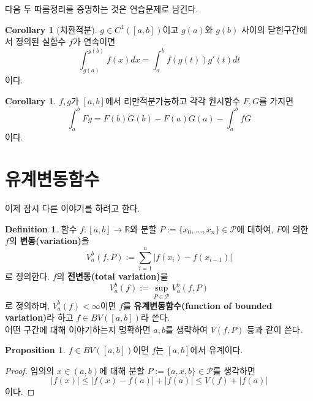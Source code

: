 \documentclass[11pt]{book}
\numberwithin{equation}{chapter}
\def\RR{\mathbb{R}}
\def\calP{\mathcal{P}}
\newcommand{\abs}[1]{\left\vert#1\right\vert}
\theoremstyle{definition}
\newtheorem{cor}[thm]{Corollary}
\newtheorem{prop}[thm]{Proposition}
\newtheorem{defn}[thm]{Definition}
\begin{document}
다음 두 따름정리를 증명하는 것은 연습문제로 남긴다.

\begin{cor}[치환적분]
    \(g \in C^1([a, b])\)이고 \(g(a)\)와 \(g(b)\) 사이의 닫힌구간에서 정의된 실함수 \(f\)가 연속이면
    \[
        \int_{g(a)}^{g(b)} f(x)dx = \int_a^b f(g(t))g'(t) dt
    \]
    이다.
\end{cor}

\begin{cor}
    \(f, g\)가 \([a, b]\)에서 리만적분가능하고 각각 원시함수 \(F, G\)를 가지면
    \[
        \int_a^b Fg = F(b)G(b) - F(a)G(a) - \int_a^b fG
    \]
    이다.
\end{cor}

\section{유계변동함수}

이제 잠시 다른 이야기를 하려고 한다.

\begin{defn}
    함수 \(f : [a, b] \to \RR\)와 분할 \(P := \{x_0, \ldots, x_n\} \in \calP\)에 대하여, \(P\)에 의한 \(f\)의 \textbf{변동(variation)}을
    \[
        V_a^b(f, P) := \sum_{i=1}^n \abs{f(x_i) - f(x_{i-1})}
    \]
    로 정의한다. \(f\)의 \textbf{전변동(total variation)}을
    \[
        V_a^b(f) := \sup_{P \in \calP} V_a^b(f, P)
    \]
    로 정의하며, \(V_a^b(f) < \infty\)이면 \(f\)를 \textbf{유계변동함수(function of bounded variation)}라 하고 \(f \in BV([a, b])\)라 쓴다.\\
    어떤 구간에 대해 이야기하는지 명확하면 \(a, b\)를 생략하여 \(V(f, P)\) 등과 같이 쓴다.
\end{defn}

\begin{prop} \label{9.5.2}
    \(f \in BV([a, b])\)이면 \(f\)는 \([a, b]\)에서 유계이다.
\end{prop}
\begin{proof}
    임의의 \(x \in (a, b)\)에 대해 분할 \(P := \{a, x, b\} \in \calP\)를 생각하면
    \[
        \abs{f(x)} \le \abs{f(x) - f(a)} + \abs{f(a)} \le V(f) + \abs{f(a)}
    \]
    이다.
\end{proof}
\end{document}

